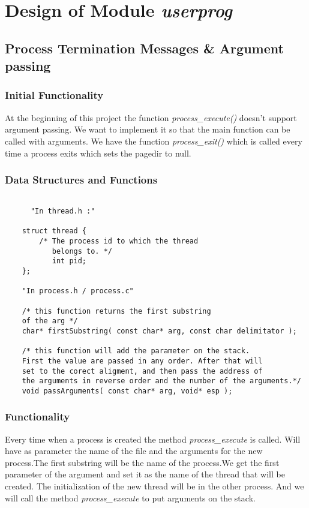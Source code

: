 \chapter{Design of Module \textit{userprog}}


\section{Process Termination Messages \& Argument passing}

    \subsection{Initial Functionality}

	At the beginning of this project the function \textit{process\_execute()} doesn't support argument passing. We want to implement it so that the main function can be called with arguments.
	We have the function \textit{process\_exit()} which is called every time a process exits which sets the pagedir to null.

    \subsection{Data Structures and Functions}

    \begin{lstlisting}

      "In thread.h :"
	
	struct thread {
	    /* The process id to which the thread
	       belongs to. */
	       int pid;
	};

	"In process.h / process.c"

	/* this function returns the first substring 
	of the arg */
	char* firstSubstring( const char* arg, const char delimitator );

	/* this function will add the parameter on the stack.
	First the value are passed in any order. After that will 
	set to the corect aligment, and then pass the address of
	the arguments in reverse order and the number of the arguments.*/
	void passArguments( const char* arg, void* esp );

    \end{lstlisting}


    \subsection{Functionality}

	  Every time when a process is created the method \textit{process\_execute} is called. Will have as parameter the name of the file and the arguments for the new process.The first substring will be the name of the process.We get the first parameter of the argument and set it as the name of the thread that will be created. The initialization of the new thread will be in the other process. And we will call the method \textit{process\_execute} to put arguments on the stack.

